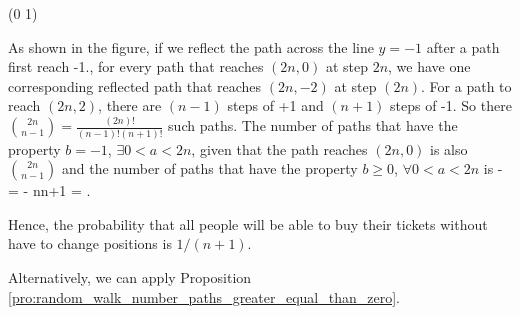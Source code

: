 \begin{solution}[\bf Solution.]
{\move (0 1)

}

As shown in the figure, if we reflect the path across the line $y=-1$ after a path first reach -1., for every path that reaches $(2n,0)$ at step $2n$, we have one corresponding reflected path that
reaches $(2n,-2)$ at step $(2n)$. For a path to reach $(2n,2)$, there are $(n-1)$ steps of +1 and $(n+1)$ steps of -1. So there $\binom{2n}{n-1} = \frac{(2n)!}{(n-1)!(n+1)!}$ such paths. The number
of paths that have the property $b=-1$, $\exists 0<a<2n$, given that the path reaches $(2n,0)$ is also $\binom{2n}{n-1}$ and the number of paths that have the property $b\geq 0$, $\forall 0<a<2n$ is
\be
{} -  =  - \frac n{n+1} = .
\ee

Hence, the probability that all people will be able to buy their tickets without have to change positions is $1/(n+1)$.

Alternatively, we can apply Proposition \ref{pro:random_walk_number_paths_greater_equal_than_zero}.
\end{solution}